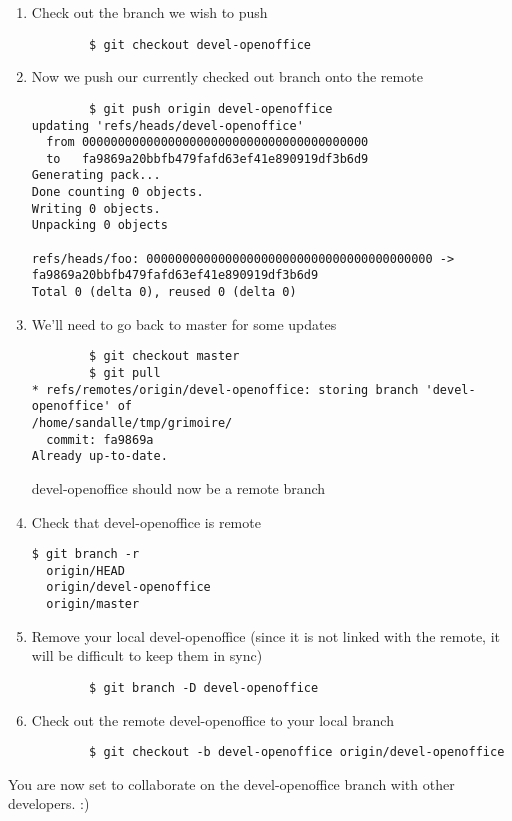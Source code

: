 \documentclass[a4paper,10pt]{book}
\begin{document}
\begin{enumerate}
	\item Check out the branch we wish to push
	\begin{verbatim}
		$ git checkout devel-openoffice
	\end{verbatim}
	\item Now we push our currently checked out branch onto the remote
	\begin{verbatim}
		$ git push origin devel-openoffice
updating 'refs/heads/devel-openoffice'
  from 0000000000000000000000000000000000000000
  to   fa9869a20bbfb479fafd63ef41e890919df3b6d9
Generating pack...
Done counting 0 objects.
Writing 0 objects.
Unpacking 0 objects

refs/heads/foo: 0000000000000000000000000000000000000000 ->
fa9869a20bbfb479fafd63ef41e890919df3b6d9
Total 0 (delta 0), reused 0 (delta 0)
	\end{verbatim}
	\item We'll need to go back to master for some updates
	\begin{verbatim}
		$ git checkout master
		$ git pull
* refs/remotes/origin/devel-openoffice: storing branch 'devel-openoffice' of
/home/sandalle/tmp/grimoire/
  commit: fa9869a
Already up-to-date.
	\end{verbatim}
devel-openoffice should now be a remote branch
	\item Check that devel-openoffice is remote
	\begin{verbatim}
$ git branch -r
  origin/HEAD
  origin/devel-openoffice
  origin/master
	\end{verbatim}
	\item Remove your local devel-openoffice (since it is not linked with
the remote, it will be difficult to keep them in sync)
	\begin{verbatim}
		$ git branch -D devel-openoffice
	\end{verbatim}
	\item Check out the remote devel-openoffice to your local branch
	\begin{verbatim}
		$ git checkout -b devel-openoffice origin/devel-openoffice
	\end{verbatim}
\end{enumerate}
You are now set to collaborate on the devel-openoffice branch with other
developers. :)
\end{document}
